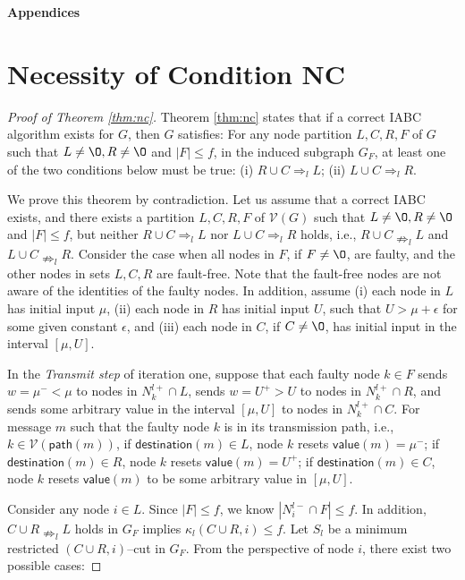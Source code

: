 \documentclass[letterpaper, 11pt]{article}
\newcommand{\calV}{{\mathcal{V}}}
\begin{document}





\newpage
\appendix

\setlength {\parskip}{6pt}

\centerline{\Large\bf Appendices}
\section{Necessity of Condition NC}\label{app:necessary}


\begin{proof}[Proof of Theorem \ref{thm:nc}]
Theorem \ref{thm:nc} states that if a correct IABC algorithm exists for $G$,  then $G$ satisfies:
For any node partition $L, C, R, F$ of $G$ such that $L\not=\O, R\not=\O$ and $|F|\le f$, in the induced subgraph $G_F$,
at least one of the two conditions below must be true: (i) $R\cup C\Rightarrow_l L$; (ii) $L\cup C\Rightarrow_l R$.

We prove this theorem by contradiction. Let us assume that a correct IABC exists, and there exists a partition $L, C, R, F$ of $\calV(G)$ such that $L\not=\O, R\not=\O$ and $|F|\le f$, but neither $R\cup C\Rightarrow_l L$ nor $L\cup C\Rightarrow_l R$ holds, i.e.,  $R\cup C\nRightarrow_l L$ and $L\cup C\nRightarrow_l R$. Consider the case when all nodes in $F$, if $F\not=\O$, are faulty, and the other nodes in sets $L, C, R$ are fault-free. Note that the fault-free nodes are not aware of the identities of the faulty nodes. In addition, assume (i) each node in $L$ has initial input $\mu$, (ii) each node in $R$ has initial input $U$, such that $U>\mu+\epsilon$ for some given constant $\epsilon$, and (iii) each node in $C$, if $C\not=\O$, has initial input in the interval $[\mu, U]$.

In the \textit{Transmit step} of iteration one, suppose that each faulty node $k\in F$ sends $w=\mu^{-}<\mu$ to nodes in $N_k^{l+}\cap L$, sends $w=U^{+}>U$ to nodes in $N_k^{l+}\cap R$, and sends some arbitrary value in the interval $[\mu, U]$ to nodes in $N_k^{l+}\cap C$. For message $m$ such that the faulty node $k$ is in its transmission path, i.e.,
$k\in \calV(\mathsf{path}(m))$, if $\mathsf{destination}(m)\in L$, node $k$ resets $\mathsf{value}(m)=\mu^-$; if $\mathsf{destination}(m)\in R$, node $k$ resets $\mathsf{value}(m)=U^+$; if
$\mathsf{destination}(m)\in C$, node $k$ resets $\mathsf{value}(m)$ to be some arbitrary value in $[\mu, U]$.

Consider any node $i\in L$.
Since $|F|\le f$, we know $|N_i^{l-}\cap F|\le f$.
In addition,  $C\cup R\nRightarrow_l L$ holds in $G_F$ implies $\kappa_l(C\cup R, i)\le f$. Let $S_l$ be a minimum restricted $(C\cup R, i)$--cut in $G_F$.
From the perspective of node $i$, there exist two possible cases:


\end{proof}
\end{document}

